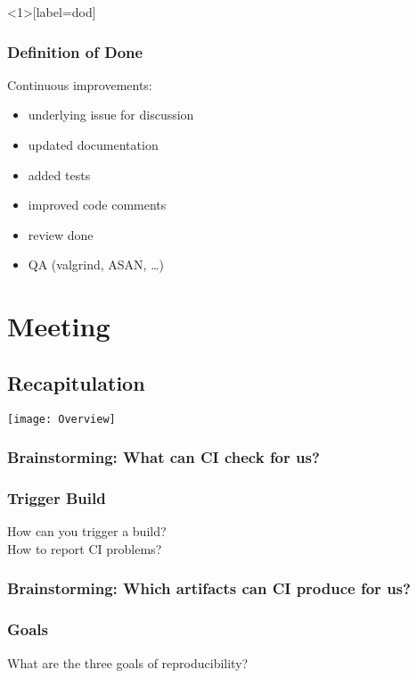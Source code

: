 \begin{frame}<1>[label=dod]
	\frametitle{Definition of Done}

	Continuous improvements:

	\begin{itemize}
	\item underlying issue for discussion
	\item updated documentation
	\item added tests
	\item improved code comments
	\item review done
	\item QA (valgrind, ASAN, \dots)
	\end{itemize}
\end{frame}


\section{Meeting}

\subsection{Recapitulation}

\begin{frame}
	\texttt{[image: Overview]}
\end{frame}


\begin{frame}
	\frametitle{Brainstorming: What can CI check for us?}
\end{frame}

\begin{frame}
	\frametitle{Trigger Build}

	\begin{task}
	How can you trigger a build? \\
	How to report CI problems?
	\end{task}
\end{frame}


\breakframe

\begin{frame}
	\frametitle{Brainstorming: Which artifacts can CI produce for us?}
\end{frame}


\begin{frame}
	\frametitle{Goals}

	\begin{task}
	What are the three goals of reproducibility?
	\end{task}
\end{frame}

